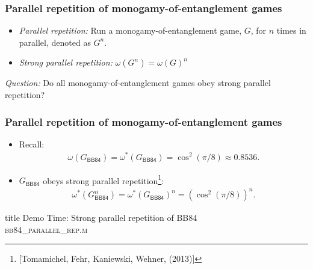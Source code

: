 \documentclass{beamer}
\newcommand{\abs}[1]{\lvert #1 \rvert}
\def\BB84{\mathsf{BB84}}
\begin{document}
  \begin{frame} 
	\frametitle{Parallel repetition of monogamy-of-entanglement games}
	\begin{itemize}
		\item \emph{Parallel repetition:} Run a monogamy-of-entanglement game, $G$, for $n$ times in parallel, denoted as $G^n$. 
		\item \emph{Strong parallel repetition:} $\omega(G^n) = \omega(G)^n$
	\end{itemize}
	\begin{center}
		\emph{Question:} Do all monogamy-of-entanglement games obey strong parallel repetition? 
	\end{center}
\end{frame}

\begin{frame}
	\frametitle{Parallel repetition of monogamy-of-entanglement games}
	\begin{itemize}
		\item Recall: 
		\begin{align*}
			\omega(G_{\BB84}) = \omega^*(G_{\BB84}) = \cos^2(\pi/8) \approx 0.8536.
		\end{align*}
		\item $G_{\BB84}$ obeys strong parallel repetition\footnote{[Tomamichel, Fehr, Kaniewski, Wehner, (2013)]}:
		\begin{equation*}
			\begin{aligned}
				\omega^*(G_{\BB84}^n) = \omega^*(G_{\BB84})^n = \left( \cos^2(\pi/8) \right)^n.
			\end{aligned}
		\end{equation*}
	\end{itemize}
\end{frame}

\begin{frame}[noframenumbering]
  \vfill
  \centering
  \begin{beamercolorbox}[sep=8pt,center,shadow=true,rounded=true]{title}
     Demo Time: Strong parallel repetition of BB84 \\ \textsc{bb84\_parallel\_rep.m}
  \end{beamercolorbox}
  \vfill
  \end{frame}
\end{document}
